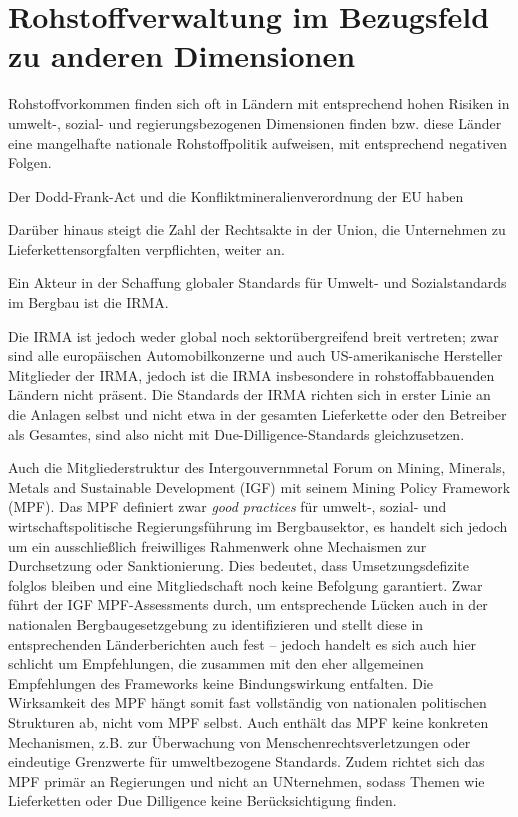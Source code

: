 \documentclass[12pt,a4paper,oneside]{book} %
\begin{document}
	
\chapter{Rohstoffverwaltung im Bezugsfeld zu anderen Dimensionen}

Rohstoffvorkommen finden sich oft in Ländern mit entsprechend hohen Risiken in umwelt-, sozial- und regierungsbezogenen Dimensionen finden\autocite{The social and environmental complexities of extracting energy transition metals} bzw. diese Länder eine mangelhafte nationale Rohstoffpolitik aufweisen, mit entsprechend negativen Folgen.\autocite{Sustainable energy transitions require enhanced resource governance}

Der Dodd-Frank-Act und die Konfliktmineralienverordnung der EU haben 

Darüber hinaus steigt die Zahl der Rechtsakte in der Union, die Unternehmen zu Lieferkettensorgfalten verpflichten, weiter an.

Ein Akteur in der Schaffung globaler Standards für Umwelt- und Sozialstandards im Bergbau ist die IRMA.

Die IRMA ist jedoch weder global noch sektorübergreifend breit vertreten; zwar sind alle europäischen Automobilkonzerne und auch US-amerikanische Hersteller Mitglieder der IRMA, jedoch ist die IRMA insbesondere in rohstoffabbauenden Ländern nicht präsent. Die Standards der IRMA richten sich in erster Linie an die Anlagen selbst und nicht etwa in der gesamten Lieferkette oder den Betreiber als Gesamtes, sind also nicht mit Due-Dilligence-Standards gleichzusetzen.


Auch die Mitgliederstruktur des Intergouvernmnetal Forum on Mining, Minerals, Metals and Sustainable Development (IGF) mit seinem Mining Policy Framework (MPF). Das MPF definiert zwar \textit{good practices} für umwelt‑, sozial‑ und wirtschaftspolitische Regierungsführung im Bergbausektor, es handelt sich jedoch um ein ausschließlich freiwilliges Rahmenwerk ohne Mechaismen zur Durchsetzung oder Sanktionierung. Dies bedeutet, dass Umsetzungsdefizite folglos bleiben und eine Mitgliedschaft noch keine Befolgung garantiert. Zwar führt der IGF MPF-Assessments durch, um entsprechende Lücken auch in der nationalen Bergbaugesetzgebung zu identifizieren und stellt diese in entsprechenden Länderberichten auch fest -- jedoch handelt es sich auch hier schlicht um Empfehlungen, die zusammen mit den eher allgemeinen Empfehlungen des Frameworks keine Bindungswirkung entfalten. Die Wirksamkeit des MPF hängt somit fast vollständig von nationalen politischen Strukturen ab, nicht vom MPF selbst. Auch enthält das MPF keine konkreten Mechanismen, z.B. zur Überwachung von Menschenrechtsverletzungen oder eindeutige Grenzwerte für umweltbezogene Standards. Zudem richtet sich das MPF primär an Regierungen und nicht an UNternehmen, sodass Themen wie Lieferketten oder Due Dilligence keine Berücksichtigung finden.
\end{document}
